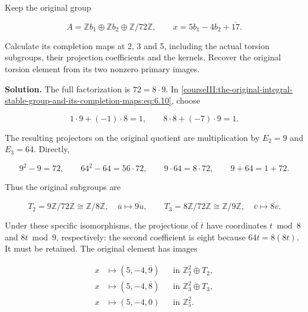 \label{courseIII:integral-stable:8.1}

Keep the original group

\begin{equation}
A=\mathbb Z b_1\oplus\mathbb Z b_2\oplus\mathbb Z/72\mathbb Z,
 \qquad x=5b_1-4b_2+\overline{17}.
 \label{courseIII:the-original-integral-stable-group-and-its-completion-maps:eq:8.1}
\end{equation}

Calculate its completion maps at 2, 3 and 5, including the actual torsion subgroups, their projection coefficients and the kernels. Recover the original torsion element from its two nonzero primary images.

\textbf{Solution.} The full factorization is \(72=8\cdot9\). In \eqref{courseIII:the-original-integral-stable-group-and-its-completion-maps:eq:6.10}, choose

\begin{equation}
1\cdot9+(-1)\cdot8=1,
 \qquad 8\cdot8+(-7)\cdot9=1.
 \label{courseIII:the-original-integral-stable-group-and-its-completion-maps:eq:8.2}
\end{equation}

The resulting projectors on the original quotient are multiplication by
\(E_2=9\) and \(E_3=64\). Directly,

\begin{equation}
9^2-9=72,\qquad64^2-64=56\cdot72,
 \qquad9\cdot64=8\cdot72,
 \qquad9+64=1+72.
 \label{courseIII:the-original-integral-stable-group-and-its-completion-maps:eq:8.3}
\end{equation}

Thus the original subgroups are

\begin{equation}
T_2=9\mathbb Z/72\mathbb Z\cong\mathbb Z/8\mathbb Z,
 \quad\overline u\longmapsto\overline{9u},
 \qquad
 T_3=8\mathbb Z/72\mathbb Z\cong\mathbb Z/9\mathbb Z,
 \quad\overline v\longmapsto\overline{8v}.
 \label{courseIII:the-original-integral-stable-group-and-its-completion-maps:eq:8.4}
\end{equation}

Under these specific isomorphisms, the projections of \(\overline t\) have coordinates \(t\bmod8\) and \(8t\bmod9\), respectively: the second coefficient is eight because \(64t=8(8t)\). It must be retained. The original element has images

\begin{equation}
\begin{aligned}
 x&\longmapsto(5,-4,\overline9)
      &&\text{in }\mathbb Z_2^2\oplus T_2,\\
 x&\longmapsto(5,-4,\overline8)
      &&\text{in }\mathbb Z_3^2\oplus T_3,\\
 x&\longmapsto(5,-4,0)
      &&\text{in }\mathbb Z_5^2.
 \end{aligned}
 \label{courseIII:the-original-integral-stable-group-and-its-completion-maps:eq:8.5}
\end{equation}

